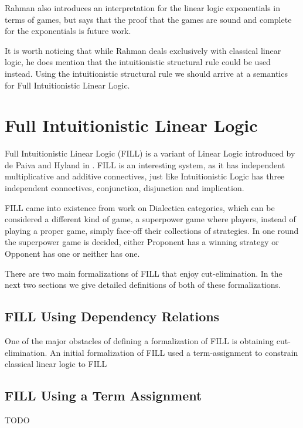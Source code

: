 \documentclass{article}
\begin{document}
 
Rahman also introduces an interpretation for the linear logic
exponentials in terms of games, but says that the proof that the games
are sound and complete for the exponentials is future work.
 
It is worth noticing that while Rahman deals exclusively with
classical linear logic, he does mention that the intuitionistic
structural rule could be used instead. Using the intuitionistic
structural rule we should arrive at a semantics for Full
Intuitionistic Linear Logic.
 
\section*{Full Intuitionistic Linear Logic}

Full Intuitionistic Linear Logic (FILL) is a variant of Linear Logic
introduced by de Paiva and Hyland in \cite{Hyland:1993}. FILL is an
interesting system, as it has independent multiplicative and additive
connectives, just like Intuitionistic Logic has three independent
connectives, conjunction, disjunction and implication.

FILL came into existence from work on Dialectica categories, which can
be considered a different kind of game, a superpower game where
players, instead of playing a proper game, simply face-off their
collections of strategies. In one round the superpower game is
decided, either Proponent has a winning strategy or Opponent has one
or neither has one.

There are two main formalizations of FILL that enjoy cut-elimination.
In the next two sections we give detailed definitions of both of these
formalizations.

\subsection*{FILL Using Dependency Relations}
\label{subsec:fill_using_dependency_relations}
One of the major obstacles of defining a formalization of FILL is
obtaining cut-elimination.  An initial formalization of FILL used a
term-assignment to constrain classical linear logic to FILL 

\subsection*{FILL Using a Term Assignment}
\label{subsec:fill_using_a_term_assignment}
TODO
\end{document}
